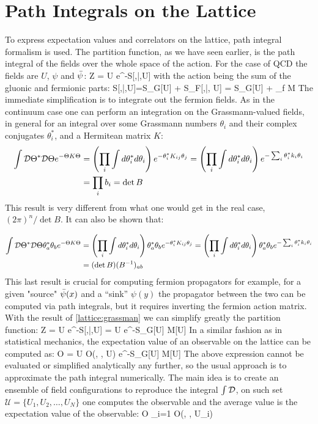 \section{Path Integrals on the Lattice}
To express expectation values and correlators on the lattice, path integral formalism is used. The partition function, as we have seen earlier, is the path integral of the fields over the whole space of the action. For the case of QCD the fields are $U$, $\psi$ and $\bar{\psi}$:
\beq
	Z = \int \D\psi\D\bpsi\D U e^{-S[\psi,\bar{\psi},U] }  
\eeq
with the action being the sum of the gluonic and fermionic parts:
\beq
S[\psi,\bar{\psi},U]=S_G[U] + S_F[\psi,\bar{\psi}, U] = S_G[U] + \sum_f \bpsi M \psi
\eeq
The immediate simplification is to integrate out the fermion fields. As in the continuum case one can perform an integration on the Grassmann-valued fields, in general for an integral over some Grassmann numbers $\theta_i$ and their complex conjugates $\theta_i^*$, and a Hermitean matrix $K$:
\begin{align}
    \label{lattice:grassman}
    \int \mathcal{D}\Theta^*\mathcal{D}\Theta e^{-\Theta K \Theta } &= \left( \prod_i\int d\theta_i^*d\theta_i \right)  e^{-\theta_i^* K_{ij} \theta_j } =  \left( \prod_i\int d\theta_i^*d\theta_i \right)  e^{-\sum_i\theta_i^* k_i \theta_i } \\\nonumber
    &= \prod_i b_i = \det B
\end{align} 
This result is very different from what one would get in the real case, $(2\pi)^n/\det B$. It can also be shown that:

\begin{align}
    \int \mathcal{D}\Theta^*\mathcal{D}\Theta \theta_a^*\theta_b e^{-\Theta K \Theta } &= \left( \prod_i\int d\theta_i^*d\theta_i \right) \theta_a^*\theta_b e^{-\theta_i^* K_{ij} \theta_j } =  \left( \prod_i\int d\theta_i^*d\theta_i \right) \theta_a^*\theta_b e^{-\sum_i\theta_i^* k_i \theta_i } \\\nonumber
    &=  (\det B ) (B^{-1})_{ab}
\end{align}
This last result is crucial for computing fermion propagators for example, for a given "source" $\bar{\psi}(x)$ and a ``sink'' $\psi(y)$ the propagator between the two can be computed via path integrals, but it requires inverting the fermion action matrix. \\
With the result of \ref{lattice:grassman} we can simplify greatly the partition function:
\beq
	Z = \int \D\psi\D\bpsi\D U e^{-S[\psi,\bar{\psi},U] }  = \int \D U e^{-S_G[U] } \det M[U] 
\eeq
In a similar fashion as in statistical mechanics, the expectation value of an observable on the lattice can be computed as:
\beq
    \langle O \rangle =   \int \D U O(\psi, \bpsi, U) e^{-S_G[U] } \det M[U] 
    \label{lattice:expectation}
\eeq
The above expression cannot be evaluated or simplified analytically any further, so the usual approach is to approximate the path integral numerically. The main idea is to create an ensemble of field configurations to reproduce the integral $\int\mathcal{D}$, on such set $\mathcal{U} = \{ U_1, U_2, \dots,U_N \}$ one computes the observable and the average value is the expectation value of the observable:
\beq
\langle O \rangle \approx  {} \sum_{i=1} O(\psi, \bpsi, U_i) 
\eeq

